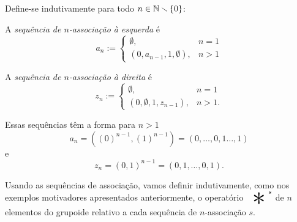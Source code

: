 \begin{definition}
Define-se indutivamente para todo $n \in \mathbb{N} \smallsetminus \{0\}$:

A \emph{sequência de $n$-associação à esquerda} é
	\begin{equation*}
	a_n :=
		\begin{cases}
		\emptyset,					& n=1 \\
		(0,a_{n-1},1,\emptyset),	& n>1
		\end{cases}
	\end{equation*}

A \emph{sequência de $n$-associação à direita} é
	\begin{equation*}
	z_n :=
		\begin{cases}
		\emptyset,					& n=1 \\
		(0,\emptyset,1,z_{n-1}),	& n>1.
		\end{cases}
	\end{equation*}

\begin{comment}
	\begin{equation*}
	(a_m)_i :=
		\begin{cases}
		0,	& 0 \leq i < m-1 \\
		1,	& m-1 \leq i < 2(m-1)
		\end{cases}
	\end{equation*}
e
	\begin{equation*}
	(z_m)_i :=
		\begin{cases}
		0,	& i \in \set{2j}{j \in \{0,\cdots,m-2\}} \\
		1,	& i \in \set{2j+1}{j \in \{0,\cdots,m-2\}}.
		\end{cases}
	\end{equation*}
\end{comment}
\end{definition}

Essas sequências têm a forma para $n>1$
	\begin{equation*}
	a_n = ((0)^{n-1},(1)^{n-1}) =  (0,\ldots,0,1\ldots,1)
	\end{equation*}
e
	\begin{equation*}
	z_n = (0,1)^{n-1} = (0,1,\ldots,0,1).
	\end{equation*}


Usando as sequências de associação, vamos definir indutivamente, como nos exemplos motivadores apresentados anteriormente, o operatório $\displaystyle\bigopb\nolimits^{s}$ de $n$ elementos do grupoide relativo a cada sequência de $n$-associação $s$.

